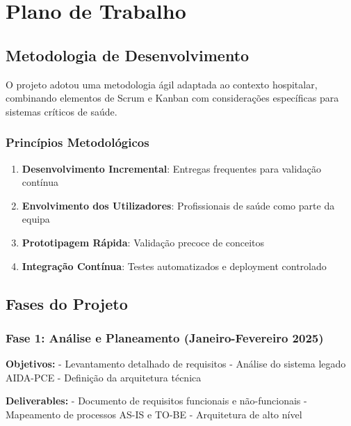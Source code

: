 \chapter{Plano de Trabalho}


\section{Metodologia de Desenvolvimento}

O projeto adotou uma metodologia ágil adaptada ao contexto hospitalar, combinando elementos de Scrum e Kanban com considerações específicas para sistemas críticos de saúde.

\subsection{Princípios Metodológicos}

\begin{enumerate}
    \item \textbf{Desenvolvimento Incremental}: Entregas frequentes para validação contínua
    \item \textbf{Envolvimento dos Utilizadores}: Profissionais de saúde como parte da equipa
    \item \textbf{Prototipagem Rápida}: Validação precoce de conceitos
    \item \textbf{Integração Contínua}: Testes automatizados e deployment controlado
\end{enumerate}


\section{Fases do Projeto}

\subsection{Fase 1: Análise e Planeamento (Janeiro-Fevereiro 2025)}

\textbf{Objetivos:}
- Levantamento detalhado de requisitos
- Análise do sistema legado AIDA-PCE
- Definição da arquitetura técnica

\textbf{Deliverables:}
- Documento de requisitos funcionais e não-funcionais
- Mapeamento de processos AS-IS e TO-BE
- Arquitetura de alto nível


